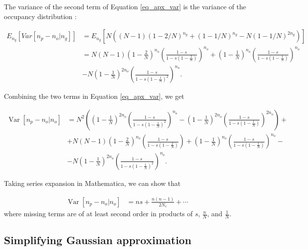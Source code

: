 \documentclass[review]{elsarticle}
\begin{document}
The variance of the second term of Equation \eqref{eq_apx_var} is the variance of the occupancy distribution \cite{ref}:

\begin{equation}
\begin{split}
E_{n_g}\left[Var\left[n_p-n_o | n_g \right]\right] & = E_{n_g}\left[N ((N - 1) (1 - 2/N)^{n_g} + (1 - 1/N)^{n_g} - N (1 - 1/N)^{2 n_g}) \right] \\
& = N (N-1)  \left(1-\frac{2}{N}\right)^{n_o} \left(\frac{1- s}{1- s  \left(1-\frac{2}{N}\right)}\right)^{n_o} +  \left(1-\frac{1}{N}\right)^{n_o} \left(\frac{1- s}{1- s  \left(1-\frac{1}{N}\right)}\right)^{n_o} \\
&-N  \left(1-\frac{1}{N}\right)^{2n_o} \left(\frac{1-  s}{1- s  \left(1-\frac{1}{N}\right)^2}\right)^{n_o}. 
\end{split}
\end{equation}

Combining the two terms in Equation \eqref{eq_apx_var}, we get

\newcommand{\vara}[1]{\left(1-\frac{#1}{N}\right)}
\newcommand{\varb}[1]{\left(\frac{1-s}{1-s #1}\right)}

\begin{equation}
  \begin{aligned}
    \operatorname{Var}[n_p-n_o | n_o] &=
    N^2\left( \vara{1}^{2n_o}\varb{\vara{1}^2}^{n_o}-\vara{1}^{2n_o}\varb{\vara{1}}^{2n_o} \right) + \\
    &+ N(N-1)\vara{2}^{n_o}\varb{\vara{2}} + \vara{1}^{n_o}\varb{\vara{1}}^{n_o} - \\
    &- N\vara{1}^{2n_o} \varb{\vara{1}^{2}}^{n_o}.
    \label{eq_exact_var}
  \end{aligned}
\end{equation}

Taking series expansion in Mathematica, we can show that  

\begin{equation}
  \begin{aligned}
    \operatorname{Var}[n_p-n_o | n_o] &= n s + \frac{n (n-1)}{2 N_e}  + \cdots
    \label{eq_exact_var}
  \end{aligned}
\end{equation}
where missing terms are of at least second order in products of  $s$, $\frac{n}{N}$,  and $\frac{1}{N}.$

\subsection{Simplifying Gaussian approximation}
\label{subsec_apx_gauss}
\end{document}
